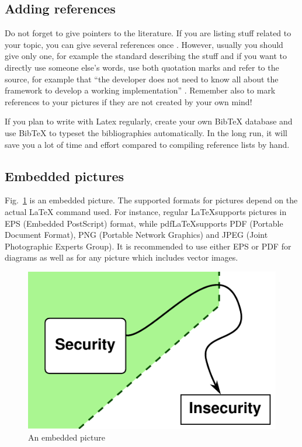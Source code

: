 \documentclass[article]{aaltoseries}
\begin{document}


\subsection{Adding references}
\label{sec:references}

Do not forget to give pointers to the literature. If you are listing
stuff related to your topic, you can give several references once
\cite{Com00,HTS03,Nik99}. However, usually you should give only one, for example the standard describing the stuff \cite{RFC2408} and if you want to directly use someone else's words, use both quotation marks and refer to the source, for example that ``the developer does not need to know all about the framework to develop a working implementation'' \cite{Suo98}. Remember also to mark references to your pictures if they are not created by your own mind!

If you plan to write with Latex regularly, create your own BibTeX
database and use BibTeX to typeset the bibliographies automatically.
In the long run, it will save you a lot of time and effort compared to
compiling reference lists by hand.




\subsection{Embedded pictures}
\label{sec:pictures}

Fig.~\ref{fig:mypicture1} is an embedded picture. The supported formats for pictures
depend on the actual LaTeX command used. For instance, regular \LaTeX supports
pictures in EPS (Embedded PostScript) format, while pdf\LaTeX supports PDF (Portable
Document Format), PNG (Portable Network Graphics) and JPEG (Joint Photographic Experts
Group). It is recommended to use either EPS or PDF for diagrams as well as for any picture
which includes vector images.

\begin{figure}[t!]
  \begin{center}
    \includegraphics[width=.5\textwidth]{figures/sample}
    \caption{An embedded picture}
    \label{fig:mypicture1}
  \end{center}
\end{figure}
\end{document}

